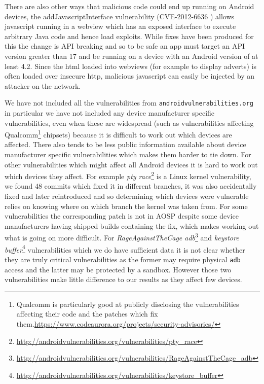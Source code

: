 \documentclass[conference,a4paper,twoside]{IEEEtran}
\newcommand{\avo}{\texttt{androidvulnerabilities.org}}
\begin{document}
There are also other ways that malicious code could end up running on Android devices, the addJavascriptInterface vulnerability (CVE-2012-6636 ) allows javascript running in a webview which has an exposed interface to execute arbitrary Java code and hence load exploits.
While fixes have been produced for this the change is API breaking and so to be safe an app must target an API version greater than 17 and be running on a device with an Android version of at least 4.2.
Since the html loaded into webviews (for example to display adverts) is often loaded over insecure http, malicious javascript can easily be injected by an attacker on the network.

We have not included all the vulnerabilities from \avo\, in particular we have not included any device manufacturer specific vulnerabilities, even when these are widespread (such as vulnerabilities affecting Qualcomm\footnote{Qualcomm is particularly good at publicly disclosing the vulnerabilities affecting their code and the patches which fix them.\url{https://www.codeaurora.org/projects/security-advisories/}} chipsets) because it is difficult to work out which devices are affected.
There also tends to be less public information available about device manufacturer specific vulnerabilities which makes them harder to tie down.
For other vulnerabilities which might affect all Android devices it is hard to work out which devices they affect.
For example \emph{pty race}\footnote{\url{http://androidvulnerabilities.org/vulnerabilities/pty_race}} is a Linux kernel vulnerability, we found 48 commits which fixed it in different branches, it was also accidentally fixed and later reintroduced and so determining which devices were vulnerable relies on knowing where on which branch the kernel was taken from.
For some vulnerabilities the corresponding patch is not in AOSP despite some device manufacturers having shipped builds containing the fix, which makes working out what is going on more difficult.
For \emph{RageAgainstTheCage adb}\footnote{\url{http://androidvulnerabilities.org/vulnerabilities/RageAgainstTheCage_adb}} and \emph{keystore buffer}\footnote{\url{http://androidvulnerabilities.org/vulnerabilities/keystore_buffer}} vulnerabilities which we do have sufficient data it is not clear whether they are truly critical vulnerabilities as the former may require physical \texttt{adb} access and the latter may be protected by a sandbox.
However those two vulnerabilities make little difference to our results as they affect few devices.
\end{document}
